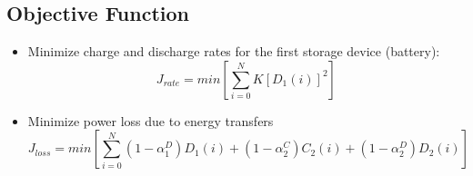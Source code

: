 \documentclass{article}
\begin{document}
	\subsection{Objective Function}
	\begin{itemize}
		\item Minimize charge and discharge rates
		 for the first storage device (battery):
		 \[J_{rate}=min\left[\sum_{i=0}^{N}K\left[D_{1}(i)\right]^{2}\right]\]
 		\item Minimize power loss due to energy transfers
		 \[J_{loss}=min\left[\sum_{i=0}^{N}
		 (1-\alpha_{1}^{D})D_{1}(i)+
		 (1-\alpha_{2}^{C})C_{2}(i)+
 		 (1-\alpha_{2}^{D})D_{2}(i)
		  \right]\]
	\end{itemize}
	
	
	
\end{document}
